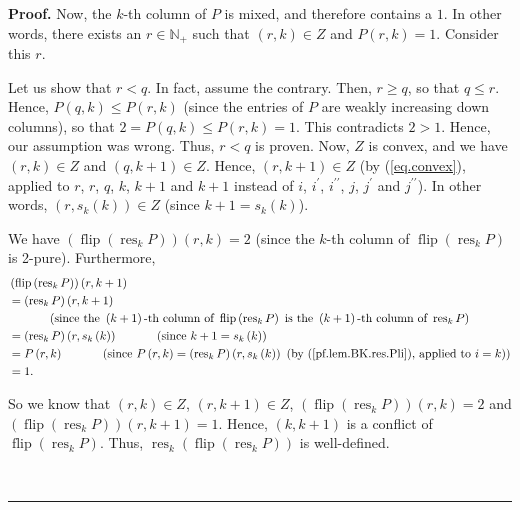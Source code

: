 \documentclass[numbers=enddot,12pt,final,onecolumn,notitlepage]{scrartcl}%
\theoremstyle{definition}
\newenvironment{proof}[1][Proof]{\noindent\textbf{#1.} }{\ \rule{0.5em}{0.5em}}
\begin{document}
\begin{proof}
Now, the $k$-th column of $P$ is mixed, and therefore contains a $1$. In other
words, there exists an $r\in\mathbb{N}_{+}$ such that $\left(  r,k\right)  \in
Z$ and $P\left(  r,k\right)  =1$. Consider this $r$.

Let us show that $r<q$. In fact, assume the contrary. Then, $r\geq q$, so that
$q\leq r$. Hence, $P\left(  q,k\right)  \leq P\left(  r,k\right)  $ (since the
entries of $P$ are weakly increasing down columns), so that $2=P\left(
q,k\right)  \leq P\left(  r,k\right)  =1$. This contradicts $2>1$. Hence, our
assumption was wrong. Thus, $r<q$ is proven. Now, $Z$ is convex, and we have
$\left(  r,k\right)  \in Z$ and $\left(  q,k+1\right)  \in Z$. Hence, $\left(
r,k+1\right)  \in Z$ (by (\ref{eq.convex}), applied to $r$, $r$, $q$, $k$,
$k+1$ and $k+1$ instead of $i$, $i^{\prime}$, $i^{\prime\prime}$, $j$,
$j^{\prime}$ and $j^{\prime\prime}$). In other words, $\left(  r,s_{k}\left(
k\right)  \right)  \in Z$ (since $k+1=s_{k}\left(  k\right)  $).

We have $\left(  \operatorname*{flip}\left(  \operatorname*{res}%
\nolimits_{k}P\right)  \right)  \left(  r,k\right)  =2$ (since the $k$-th
column of $\operatorname*{flip}\left(  \operatorname*{res}\nolimits_{k}%
P\right)  $ is 2-pure). Furthermore,
\begin{align*}
&  \left(  \operatorname*{flip}\left(  \operatorname*{res}\nolimits_{k}%
P\right)  \right)  \left(  r,k+1\right) \\
&  =\left(  \operatorname*{res}\nolimits_{k}P\right)  \left(  r,k+1\right) \\
&  \ \ \ \ \ \ \ \ \ \ \left(  \text{since the }\left(  k+1\right)  \text{-th
column of }\operatorname*{flip}\left(  \operatorname*{res}\nolimits_{k}%
P\right)  \text{ is the }\left(  k+1\right)  \text{-th column of
}\operatorname*{res}\nolimits_{k}P\right) \\
&  =\left(  \operatorname*{res}\nolimits_{k}P\right)  \left(  r,s_{k}\left(
k\right)  \right)  \ \ \ \ \ \ \ \ \ \ \left(  \text{since }k+1=s_{k}\left(
k\right)  \right) \\
&  =P\left(  r,k\right)  \ \ \ \ \ \ \ \ \ \ \left(  \text{since }P\left(
r,k\right)  =\left(  \operatorname*{res}\nolimits_{k}P\right)  \left(
r,s_{k}\left(  k\right)  \right)  \text{ (by (\ref{pf.lem.BK.res.Pli}),
applied to }i=k\text{)}\right) \\
&  =1.
\end{align*}


So we know that $\left(  r,k\right)  \in Z$, $\left(  r,k+1\right)  \in Z$,
$\left(  \operatorname*{flip}\left(  \operatorname*{res}\nolimits_{k}P\right)
\right)  \left(  r,k\right)  =2$ and $\left(  \operatorname*{flip}\left(
\operatorname*{res}\nolimits_{k}P\right)  \right)  \left(  r,k+1\right)  =1$.
Hence, $\left(  k,k+1\right)  $ is a conflict of $\operatorname*{flip}\left(
\operatorname*{res}\nolimits_{k}P\right)  $. Thus, $\operatorname*{res}%
\nolimits_{k}\left(  \operatorname*{flip}\left(  \operatorname*{res}%
\nolimits_{k}P\right)  \right)  $ is well-defined.


\end{proof}
\end{document}

